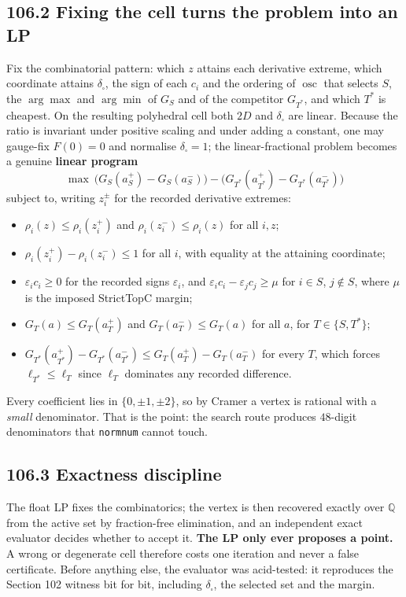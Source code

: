 \documentclass[9pt,twocolumn]{article}
\renewcommand{\_}{\CIGunderscore\allowbreak}
\begin{document}
\subsection*{106.2 Fixing the cell turns the problem into an LP}
Fix the combinatorial pattern: which $z$ attains each derivative extreme, which coordinate attains $\delta_{\square}$, the sign of each $c_i$ and the ordering of $\operatorname{osc}$ that selects $S$, the $\arg\max$ and $\arg\min$ of $G_S$ and of the competitor $G_{T^\ast}$, and which $T^\ast$ is cheapest. On the resulting polyhedral cell both $2D$ and $\delta_{\square}$ are linear. Because the ratio is invariant under positive scaling and under adding a constant, one may gauge-fix $F(0)=0$ and normalise $\delta_{\square}=1$; the linear-fractional problem becomes a genuine \textbf{linear program}
\[
\max\ \bigl(G_S(a^+_S)-G_S(a^-_S)\bigr)-\bigl(G_{T^\ast}(a^+_{T^\ast})-G_{T^\ast}(a^-_{T^\ast})\bigr)
\]
subject to, writing $z^\pm_i$ for the recorded derivative extremes:
\begin{itemize}
\item $\rho_i(z)\le\rho_i(z^+_i)$ and $\rho_i(z^-_i)\le\rho_i(z)$ for all $i,z$;
\item $\rho_i(z^+_i)-\rho_i(z^-_i)\le1$ for all $i$, with equality at the attaining coordinate;
\item $\varepsilon_ic_i\ge0$ for the recorded signs $\varepsilon_i$, and $\varepsilon_ic_i-\varepsilon_jc_j\ge\mu$ for $i\in S$, $j\notin S$, where $\mu$ is the imposed StrictTopC margin;
\item $G_T(a)\le G_T(a^+_T)$ and $G_T(a^-_T)\le G_T(a)$ for all $a$, for $T\in\{S,T^\ast\}$;
\item $G_{T^\ast}(a^+_{T^\ast})-G_{T^\ast}(a^-_{T^\ast})\le G_T(a^+_T)-G_T(a^-_T)$ for every $T$, which forces $\ell_{T^\ast}\le\ell_T$ since $\ell_T$ dominates any recorded difference.
\end{itemize}
Every coefficient lies in $\{0,\pm1,\pm2\}$, so by Cramer a vertex is rational with a \emph{small} denominator. That is the point: the search route produces $48$-digit denominators that \texttt{norm\_num} cannot touch.

\subsection*{106.3 Exactness discipline}
The float LP fixes the combinatorics; the vertex is then recovered exactly over $\mathbb{Q}$ from the active set by fraction-free elimination, and an independent exact evaluator decides whether to accept it. \textbf{The LP only ever proposes a point.} A wrong or degenerate cell therefore costs one iteration and never a false certificate. Before anything else, the evaluator was acid-tested: it reproduces the Section 102 witness bit for bit, including $\delta_{\square}$, the selected set and the margin.
\end{document}
